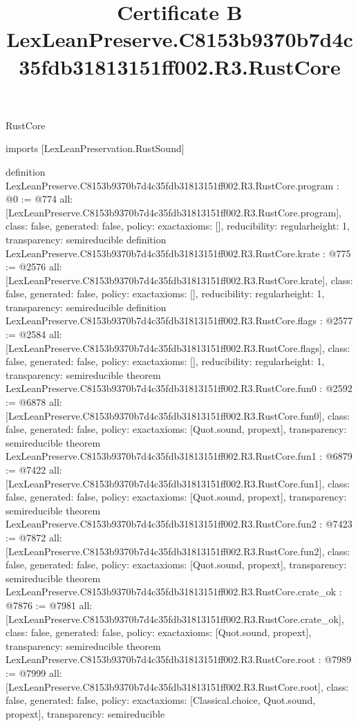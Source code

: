\begin{lexlean}{RustCore}
\title{Certificate B LexLeanPreserve.C8153b9370b7d4c35fdb31813151ff002.R3.RustCore}
\begin{coremodule}
imports [LexLeanPreservation.RustSound]

definition LexLeanPreserve.C8153b9370b7d4c35fdb31813151ff002.R3.RustCore.program : @0 := @774 {
  all: [LexLeanPreserve.C8153b9370b7d4c35fdb31813151ff002.R3.RustCore.program],
  class: false,
  generated: false,
  policy: exact{axioms: []},
  reducibility: regular{height: 1},
  transparency: semireducible
}
definition LexLeanPreserve.C8153b9370b7d4c35fdb31813151ff002.R3.RustCore.krate : @775 := @2576 {
  all: [LexLeanPreserve.C8153b9370b7d4c35fdb31813151ff002.R3.RustCore.krate],
  class: false,
  generated: false,
  policy: exact{axioms: []},
  reducibility: regular{height: 1},
  transparency: semireducible
}
definition LexLeanPreserve.C8153b9370b7d4c35fdb31813151ff002.R3.RustCore.flags : @2577 := @2584 {
  all: [LexLeanPreserve.C8153b9370b7d4c35fdb31813151ff002.R3.RustCore.flags],
  class: false,
  generated: false,
  policy: exact{axioms: []},
  reducibility: regular{height: 1},
  transparency: semireducible
}
theorem LexLeanPreserve.C8153b9370b7d4c35fdb31813151ff002.R3.RustCore.fun0 : @2592 := @6878 {
  all: [LexLeanPreserve.C8153b9370b7d4c35fdb31813151ff002.R3.RustCore.fun0],
  class: false,
  generated: false,
  policy: exact{axioms: [Quot.sound, propext]},
  transparency: semireducible
}
theorem LexLeanPreserve.C8153b9370b7d4c35fdb31813151ff002.R3.RustCore.fun1 : @6879 := @7422 {
  all: [LexLeanPreserve.C8153b9370b7d4c35fdb31813151ff002.R3.RustCore.fun1],
  class: false,
  generated: false,
  policy: exact{axioms: [Quot.sound, propext]},
  transparency: semireducible
}
theorem LexLeanPreserve.C8153b9370b7d4c35fdb31813151ff002.R3.RustCore.fun2 : @7423 := @7872 {
  all: [LexLeanPreserve.C8153b9370b7d4c35fdb31813151ff002.R3.RustCore.fun2],
  class: false,
  generated: false,
  policy: exact{axioms: [Quot.sound, propext]},
  transparency: semireducible
}
theorem LexLeanPreserve.C8153b9370b7d4c35fdb31813151ff002.R3.RustCore.crate_ok : @7876 := @7981 {
  all: [LexLeanPreserve.C8153b9370b7d4c35fdb31813151ff002.R3.RustCore.crate_ok],
  class: false,
  generated: false,
  policy: exact{axioms: [Quot.sound, propext]},
  transparency: semireducible
}
theorem LexLeanPreserve.C8153b9370b7d4c35fdb31813151ff002.R3.RustCore.root : @7989 := @7999 {
  all: [LexLeanPreserve.C8153b9370b7d4c35fdb31813151ff002.R3.RustCore.root],
  class: false,
  generated: false,
  policy: exact{axioms: [Classical.choice, Quot.sound, propext]},
  transparency: semireducible
}


\end{coremodule}
\end{lexlean}
